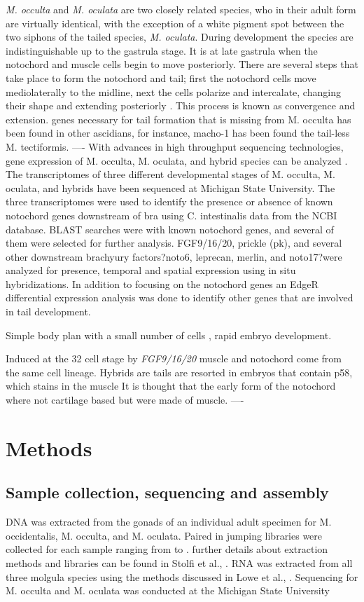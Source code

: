 \textit{M. occulta} and \textit{M. oculata} are two closely related species, who in their adult form are virtually identical, with the exception of a white pigment spot between the two siphons of the tailed species, \textit{M. oculata}. During development the species are indistinguishable up to the gastrula stage. It is at late gastrula when the notochord and muscle cells begin to move posteriorly. There are several steps that take place to form the notochord and tail; first the notochord cells move mediolaterally to the midline, next the cells polarize and intercalate, changing their shape and extending posteriorly \cite{keller_mechanisms_2000, jiang_ascidian_2005,stemple_structure_2005}. This process is known as convergence and extension. 
genes necessary for tail formation that is missing from M. occulta has been found in other ascidians, for instance, macho-1 has been found the tail-less M. tectiformis. 
----
With advances in high throughput sequencing technologies, gene expression of M. occulta, M. oculata, and hybrid species can be analyzed \cite{gyoja_analysis_2007,pickrell_variation_2010}. The transcriptomes of three different developmental stages of M. occulta, M. oculata, and hybrids have been sequenced at Michigan State University. The three transcriptomes were used to identify the presence or absence of known notochord genes downstream of bra using C. intestinalis data from the NCBI database. BLAST searches were with known notochord genes, and several of them were selected for further analysis. FGF9/16/20, prickle (pk), and several other downstream brachyury factors?noto6, leprecan, merlin, and noto17?were analyzed for presence, temporal and spatial expression using in situ hybridizations. In addition to focusing on the notochord genes an EdgeR differential expression analysis was done to identify other genes that are involved in tail development.

Simple body plan with a small number of cells \cite{satoh_ascidian_2001,satoh_genome_2002}, rapid embryo development.

Induced at the 32 cell stage by \textit{FGF9/16/20}
muscle and notochord come from the same cell lineage.
Hybrids are tails are resorted in embryos that contain p58, which stains in the muscle 
It is thought that the early form of the notochord where not cartilage based but were made of muscle.   
----
\section{Methods}
\subsection{Sample collection, sequencing and assembly}
DNA was extracted from the gonads of an individual adult specimen for M. occidentalis, M. occulta, and M. oculata. Paired in jumping libraries were collected for each sample ranging from  to . further details about extraction methods and libraries can be found in Stolfi et al., \cite{}. RNA was extracted from all three molgula species using the methods discussed in Lowe et al., \cite{}. Sequencing for M. occulta and M. oculata was conducted at the Michigan State University 



